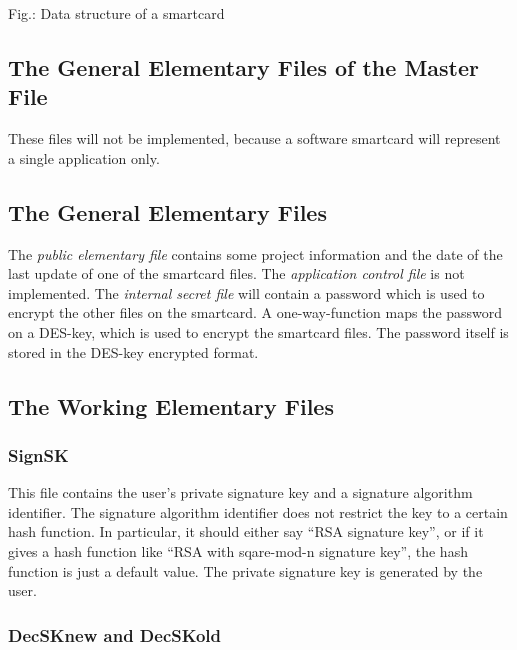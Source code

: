 \begin{center}
\end{center}
\label{fig-sc-struct}
{\footnotesize Fig.: Data structure of a smartcard}

\subsection{The General Elementary Files of the Master File}
\label{sc-mef}

These files will not be implemented, because a software smartcard
will represent a single application only.

\subsection{The General Elementary Files}
\label{sc-gef}

The {\em public elementary file} contains some project information
and the date of the last update of one of the smartcard files.
The {\em application control file} is not implemented.
The {\em internal secret file} will contain a password
which is used to encrypt the other files on the smartcard.
A one-way-function maps the password on a DES-key, which is used
to encrypt the smartcard files.
The password itself is stored in the DES-key encrypted format.

\subsection{The Working Elementary Files}
\label{sc-wef}

\subsubsection{SignSK}
\label{signsk}

This file contains the user's private signature key and a signature algorithm
identifier. The signature algorithm identifier does not restrict the key
to a certain hash function. In particular, it should either say
``RSA signature key'', or if it gives a hash function like
``RSA with sqare-mod-n signature key'',
the hash function is just a default value.
The private signature key is generated by the user.

\subsubsection{DecSKnew and DecSKold}
\label{decsk}

